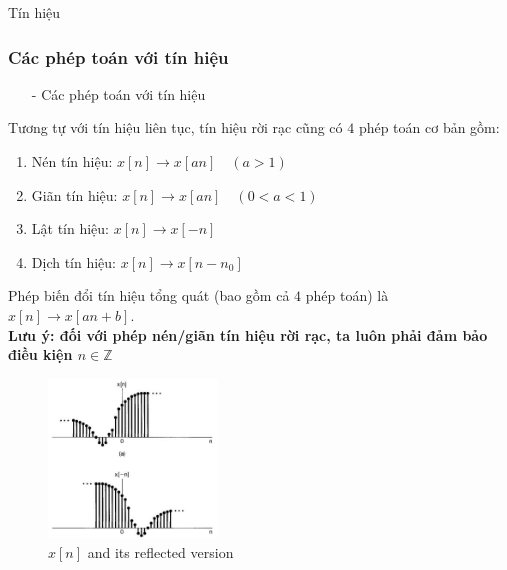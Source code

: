 \documentclass[8pt]{beamer}
\begin{document}
\begin{frame}{Tín hiệu}
\subsubsection{Các phép toán với tín hiệu}
\begin{itemize}
\item[-] Các phép toán với tín hiệu
\end{itemize}
Tương tự với tín hiệu liên tục, tín hiệu rời rạc cũng có $4$ phép toán cơ bản gồm:
\begin{enumerate}
	\item Nén tín hiệu: $x[n]\to x[an]\quad (a>1)$
	\item Giãn tín hiệu: $x[n]\to x[an]\quad (0<a<1)$
	\item Lật tín hiệu: $x[n]\to x[-n]$
	\item Dịch tín hiệu: $x[n]\to x[n-n_{0}]$
\end{enumerate}
Phép biến đổi tín hiệu tổng quát (bao gồm cả $4$ phép toán) là $x[n]\to x[an+b]$.
\\ \textbf{Lưu ý: đối với phép nén/giãn tín hiệu rời rạc, ta luôn phải đảm bảo điều kiện $n\in \mathbb{Z}$}

\begin{figure}[h]
			\includegraphics[width=0.4\textwidth]{reflect.jpg}
			\caption{$x[n]$ and its reflected version}	\label{fig:re12}
		\end{figure}
\end{frame}
\end{document}
